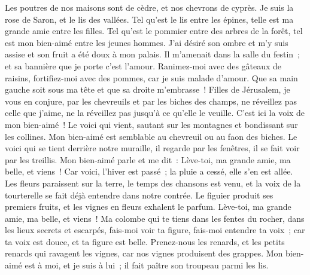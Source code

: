 \begin{multicols}{2}
Les poutres de nos maisons sont de cèdre, et nos chevrons de cyprès.
\VerseOne{} Je suis la rose de Saron, et le lis des vallées.
 Tel qu'est le lis entre les épines, telle est ma grande amie entre les filles.
 Tel qu'est le pommier entre des arbres de la forêt, tel est mon bien-aimé entre les jeunes hommes. J'ai désiré son ombre et m'y suis assise et son fruit a été doux à mon palais.
Il m'amenait dans la salle du festin~; et sa bannière que je porte c'est l'amour.
 Ranimez-moi avec des gâteaux de raisins, fortifiez-moi avec des pommes, car je suis malade d'amour.
Que sa main gauche soit sous ma tête et que sa droite m'embrasse~!
 Filles de Jérusalem, je vous en conjure, par les chevreuils et par les biches des champs, ne réveillez pas celle que j'aime, ne la réveillez pas jusqu'à ce qu'elle le veuille.
 C'est ici la voix de mon bien-aimé~! Le voici qui vient, sautant sur les montagnes et bondissant sur les collines.
Mon bien-aimé est semblable au chevreuil ou au faon des biches. Le voici qui se tient derrière notre muraille, il regarde par les fenêtres, il se fait voir par les treillis.
 Mon bien-aimé parle et me dit~: Lève-toi, ma grande amie, ma belle, et viens~!
Car voici, l'hiver est passé~; la pluie a cessé, elle s'en est allée.
Les fleurs paraissent sur la terre, le temps des chansons est venu, et la voix de la tourterelle se fait déjà entendre dans notre contrée.
Le figuier produit ses premiers fruits, et les vignes en fleurs exhalent le parfum. Lève-toi, ma grande amie, ma belle, et viens~!
Ma colombe qui te tiens dans les fentes du rocher, dans les lieux secrets et escarpés, fais-moi voir ta figure, fais-moi entendre ta voix~; car ta voix est douce, et ta figure est belle.
Prenez-nous les renards, et les petits renards qui ravagent les vignes, car nos vignes produisent des grappes.
 Mon bien-aimé est à moi, et je suis à lui~; il fait paître son troupeau parmi les lis.

\end{multicols}
